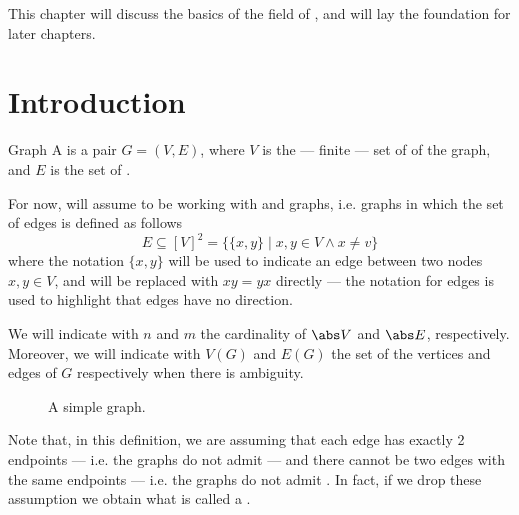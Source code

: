 \documentclass[a4paper, 12pt]{report}
\begin{document}
    This chapter will discuss the basics of the field of , and will lay the foundation for later chapters.

    \section{Introduction}

    \begin{frameddefn}{Graph}
        A  is a pair $G = (V, E)$, where $V$ is the --- finite --- set of  of the graph, and $E$ is the set of .
    \end{frameddefn}

    For now, will assume to be working with  and  graphs, i.e. graphs in which the set of edges is defined as follows $$E \subseteq [V]^2 = \{\{x, y\} \mid x, y \in V \land x \neq v\}$$ where the notation $\{x, y\}$ will be used to indicate an edge between two nodes $x, y \in V$, and will be replaced with $xy = yx$ directly --- the  notation for edges is used to highlight that edges have no direction.

    We will indicate with $n$ and $m$ the cardinality of $\abs V$ and $\abs E$, respectively. Moreover, we will indicate with $V(G)$ and $E(G)$ the set of the vertices and edges of $G$ respectively when there is ambiguity.

    \begin{figure}[H]
        \centering
        \caption{A simple graph.}
        \label{first graph}
    \end{figure}

    Note that, in this definition, we are assuming that each edge has exactly 2  endpoints --- i.e. the graphs do not admit  --- and there cannot be two edges with the same endpoints --- i.e. the graphs do not admit . In fact, if we drop these assumption we obtain what is called a .
\end{document}
